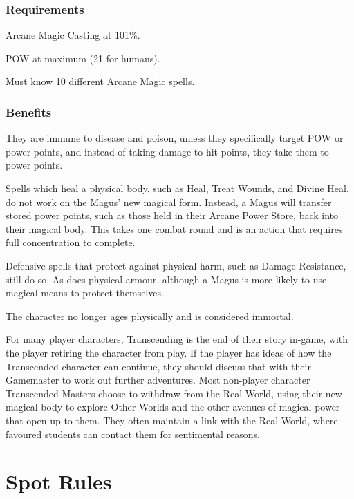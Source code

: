 \subsubsection{Requirements}
\begin{rpg-list}
\item Arcane Magic Casting at 101\%.
\item POW at maximum (21 for humans).
\item Must know 10 different Arcane Magic spells.
\end{rpg-list}

\subsubsection{Benefits}
\begin{rpg-list}
\item They are immune to disease and poison, unless they specifically target POW or power points, and instead of taking damage to hit points, they take them to power points.
\item Spells which heal a physical body, such as Heal, Treat Wounds, and Divine Heal, do not work on the Magus’ new magical form. Instead, a Magus will transfer stored power points, such as those held in their Arcane Power Store, back into their magical body. This takes one combat round and is an action that requires full concentration to complete.
\item Defensive spells that protect against physical harm, such as Damage Resistance, still do so. As does physical armour, although a Magus is more likely to use magical means to protect themselves.
\item The character no longer ages physically and is considered immortal.
\end{rpg-list}

For many player characters, Transcending is the end of their story in-game, with the player retiring the character from play. If the player has ideas of how the Transcended character can continue, they should discuss that with their Gamemaster to work out further adventures. Most non-player character Transcended Masters choose to withdraw from the Real World, using their new magical body to explore Other Worlds and the other avenues of magical power that open up to them. They often maintain a link with the Real World, where favoured students can contact them for sentimental reasons.



\section{Spot Rules}

